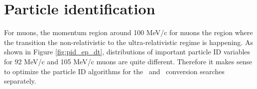 

\section{Particle identification}

For muons, the momentum region around 100 MeV/c for muons the region where the transition 
the non-relativistic to the ultra-relativistic regime is happening.
As shown in Figure \ref{fig:pid_ep_dt}, distributions of important particle ID variables 
for 92 MeV/c and 105 MeV/c muons are quite different. Therefore it makes sense to optimize
the particle ID algorithms for the \MuToEm\ and \MuToEp\ conversion searches separately.

